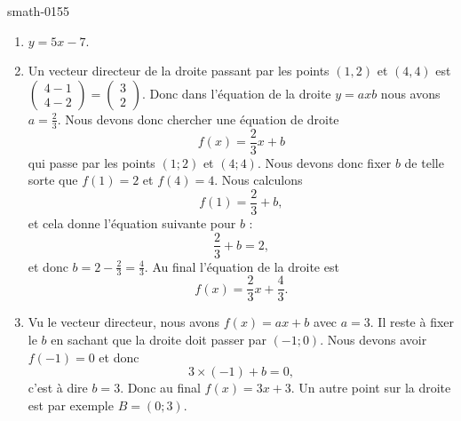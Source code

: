 
\begin{corrige}{smath-0155}

    \begin{enumerate}
        \item
            \( y=5x-7\).
        \item
            Un vecteur directeur de la droite passant par les points $(1,2)$ et $(4,4)$ est \( \begin{pmatrix}
                4-1    \\ 
                4-2    
            \end{pmatrix}=\begin{pmatrix}
                3    \\ 
                2    
            \end{pmatrix}\). Donc dans l'équation de la droite \( y=axb\) nous avons \( a=\frac{ 2 }{ 3 }\). Nous devons donc chercher une équation de droite 
            \begin{equation}
                f(x)=\frac{ 2 }{ 3 }x+b
            \end{equation}
            qui passe par les points \( (1;2)\) et \( (4;4)\). Nous devons donc fixer \( b\) de telle sorte que \( f(1)=2\) et \( f(4)=4\). Nous calculons
            \begin{equation}
                f(1)=\frac{ 2 }{ 3 }+b,
            \end{equation}
            et cela donne l'équation suivante pour \( b\) :
            \begin{equation}
                \frac{ 2 }{ 3 }+b=2,
            \end{equation}
            et donc \( b=2-\frac{ 2 }{ 3 }=\frac{ 4 }{ 3 }\). Au final l'équation de la droite est
            \begin{equation}
                f(x)=\frac{ 2 }{ 3 }x+\frac{ 4 }{ 3 }.
            \end{equation}
        \item
            Vu le vecteur directeur, nous avons \( f(x)=ax+b\) avec \( a=3\). Il reste à fixer le \( b\) en sachant que la droite doit passer par \( (-1;0)\). Nous devons avoir \( f(-1)=0\) et donc
            \begin{equation}
                3\times (-1)+b=0,
            \end{equation}
            c'est à dire \( b=3\). Donc au final \( f(x)=3x+3\). Un autre point sur la droite est par exemple \( B=(0;3)\).
            

\end{enumerate}
\end{corrige}
